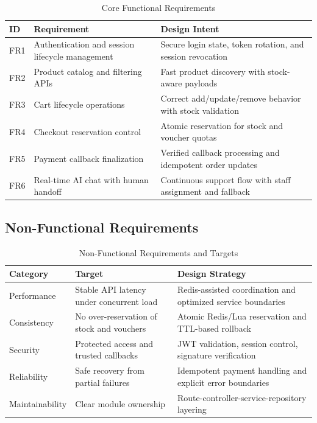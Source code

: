 \begin{table}[H]
\centering
\caption{Core Functional Requirements}
\label{tab:method-functional-requirements}
\begin{tabular}{|p{1.2cm}|p{5.6cm}|p{5.2cm}|}
\hline
\textbf{ID} & \textbf{Requirement} & \textbf{Design Intent} \\
\hline
FR1 & Authentication and session lifecycle management & Secure login state, token rotation, and session revocation \\
\hline
FR2 & Product catalog and filtering APIs & Fast product discovery with stock-aware payloads \\
\hline
FR3 & Cart lifecycle operations & Correct add/update/remove behavior with stock validation \\
\hline
FR4 & Checkout reservation control & Atomic reservation for stock and voucher quotas \\
\hline
FR5 & Payment callback finalization & Verified callback processing and idempotent order updates \\
\hline
FR6 & Real-time AI chat with human handoff & Continuous support flow with staff assignment and fallback \\
\hline
\end{tabular}
\end{table}

\subsection{Non-Functional Requirements}

\begin{table}[H]
\centering
\caption{Non-Functional Requirements and Targets}
\label{tab:method-nonfunctional-requirements}
\begin{tabular}{|p{2.8cm}|p{3.8cm}|p{5.4cm}|}
\hline
\textbf{Category} & \textbf{Target} & \textbf{Design Strategy} \\
\hline
Performance & Stable API latency under concurrent load & Redis-assisted coordination and optimized service boundaries \\
\hline
Consistency & No over-reservation of stock and vouchers & Atomic Redis/Lua reservation and TTL-based rollback \\
\hline
Security & Protected access and trusted callbacks & JWT validation, session control, signature verification \\
\hline
Reliability & Safe recovery from partial failures & Idempotent payment handling and explicit error boundaries \\
\hline
Maintainability & Clear module ownership & Route-controller-service-repository layering \\
\hline
\end{tabular}
\end{table}

